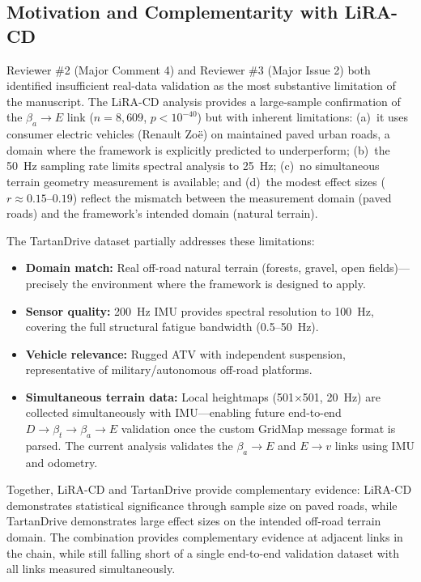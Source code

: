 \documentclass[11pt]{article}
\begin{document}
\subsection{Motivation and Complementarity with LiRA-CD}

Reviewer \#2 (Major Comment 4) and Reviewer \#3 (Major Issue 2) both identified insufficient real-data validation as the most substantive limitation of the manuscript. The LiRA-CD analysis provides a large-sample confirmation of the $\beta_a \rightarrow E$ link ($n = 8{,}609$, $p < 10^{-40}$) but with inherent limitations: (a)~it uses consumer electric vehicles (Renault Zo\"{e}) on maintained paved urban roads, a domain where the framework is explicitly predicted to underperform; (b)~the 50~Hz sampling rate limits spectral analysis to 25~Hz; (c)~no simultaneous terrain geometry measurement is available; and (d)~the modest effect sizes ($r \approx 0.15$--$0.19$) reflect the mismatch between the measurement domain (paved roads) and the framework's intended domain (natural terrain).

The TartanDrive dataset partially addresses these limitations:
\begin{itemize}
\item \textbf{Domain match:} Real off-road natural terrain (forests, gravel, open fields)---precisely the environment where the framework is designed to apply.
\item \textbf{Sensor quality:} 200~Hz IMU provides spectral resolution to 100~Hz, covering the full structural fatigue bandwidth (0.5--50~Hz).
\item \textbf{Vehicle relevance:} Rugged ATV with independent suspension, representative of military/autonomous off-road platforms.
\item \textbf{Simultaneous terrain data:} Local heightmaps (501$\times$501, 20~Hz) are collected simultaneously with IMU---enabling future end-to-end $D \rightarrow \beta_t \rightarrow \beta_a \rightarrow E$ validation once the custom GridMap message format is parsed. The current analysis validates the $\beta_a \rightarrow E$ and $E \rightarrow v$ links using IMU and odometry.
\end{itemize}

Together, LiRA-CD and TartanDrive provide complementary evidence: LiRA-CD demonstrates statistical significance through sample size on paved roads, while TartanDrive demonstrates large effect sizes on the intended off-road terrain domain. The combination provides complementary evidence at adjacent links in the chain, while still falling short of a single end-to-end validation dataset with all links measured simultaneously.
\end{document}
